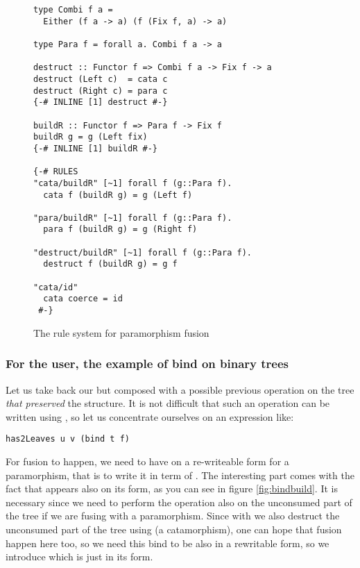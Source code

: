 \begin{figure}
\begin{verbatim}
type Combi f a =
  Either (f a -> a) (f (Fix f, a) -> a)
  
type Para f = forall a. Combi f a -> a 

destruct :: Functor f => Combi f a -> Fix f -> a
destruct (Left c)  = cata c
destruct (Right c) = para c
{-# INLINE [1] destruct #-}

buildR :: Functor f => Para f -> Fix f
buildR g = g (Left fix)
{-# INLINE [1] buildR #-}

{-# RULES
"cata/buildR" [~1] forall f (g::Para f).
  cata f (buildR g) = g (Left f)

"para/buildR" [~1] forall f (g::Para f).
  para f (buildR g) = g (Right f)

"destruct/buildR" [~1] forall f (g::Para f).
  destruct f (buildR g) = g f

"cata/id"
  cata coerce = id
 #-}
\end{verbatim}
\caption{The rule system for paramorphism fusion}
\label{fig:para}
\end{figure}

\subsubsection{For the user, the example of bind on binary trees}
Let us take back our   but composed with a possible previous operation on the tree \emph{that preserved} the structure. It is not difficult that such an operation can be written using , so let us concentrate ourselves on an expression like:

\begin{verbatim}
has2Leaves u v (bind t f)
\end{verbatim}

\noindent For fusion to happen, we need to have  on a re-writeable form for a paramorphism, that is to write it in term of . The interesting part comes with the fact that  appears also on its  form, as you can see in figure \ref{fig:bindbuild}. It is necessary since we need to perform the  operation also on the unconsumed part of the tree if we are fusing with a paramorphism. Since with  we also destruct the unconsumed part of the tree using  (a catamorphism), one can hope that fusion happen here too, so we need this bind to be also in a rewritable form, so we introduce  which is just  in its  form.

